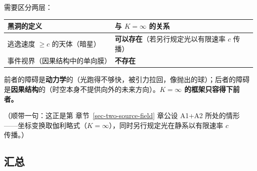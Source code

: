 \documentclass[
  chinese,
  a4paper,
  UTF8,
  12pt,
  oneside,
  openany]{ctexbook}
\newcounter{none} %
\theoremstyle{plain}
\theoremstyle{plain}
\theoremstyle{plain}
\theoremstyle{definition}
\theoremstyle{plain}
\theoremstyle{plain}
\theoremstyle{remark}
\begin{document}
需要区分两层：

{\def\LTcaptype{none} %
\begin{longtable}[]{@{}
  >{\raggedright\arraybackslash}p{}
  >{\raggedright\arraybackslash}p{}@{}}
\toprule\noalign{}
\begin{minipage}[b]{\linewidth}\raggedright
黑洞的定义
\end{minipage} & \begin{minipage}[b]{\linewidth}\raggedright
与 \(K=\infty\) 的关系
\end{minipage} \\
\midrule\noalign{}
\endhead
\bottomrule\noalign{}
\endlastfoot
逃逸速度 \(\ge c\) 的天体（暗星） &
\textbf{可以存在}（若另行规定光以有限速率 \(c\) 传播） \\
事件视界（因果结构中的单向膜） & \textbf{不存在} \\
\end{longtable}
}

前者的障碍是\textbf{动力学}的（光跑得不够快，被引力拉回，像抛出的球）；后者的障碍是\textbf{因果结构}的（时空本身不提供向外的未来方向）。\textbf{\(K=\infty\)
的框架只容得下前者。}

（顺带一句：这正是第 章节~\ref{sec-two-source-field} 章公设 A1+A2
所处的情形------坐标变换取伽利略式（\(K=\infty\)），同时另行规定光在静系以有限速率
\(c\) 传播。）

\subsection{汇总}\label{ux6c47ux603b}
\end{document}

